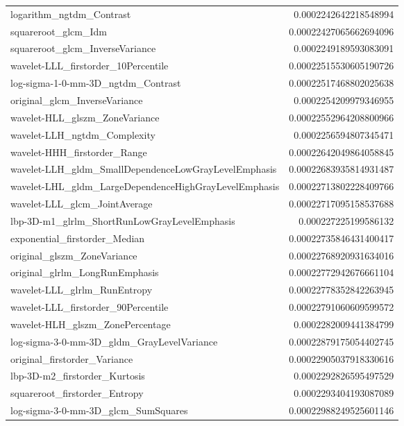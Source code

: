 {\begin{xltabular}[H]{\textwidth}{X r}
        logarithm\_ngtdm\_Contrast & 0.0002242642218548994 \\
        squareroot\_glcm\_Idm & 0.00022427065662694096 \\
        squareroot\_glcm\_InverseVariance & 0.0002249189593083091 \\
        wavelet-LLL\_firstorder\_10Percentile & 0.00022515530605190726 \\
        log-sigma-1-0-mm-3D\_ngtdm\_Contrast & 0.00022517468802025638 \\
        original\_glcm\_InverseVariance & 0.0002254209979346955 \\
        wavelet-HLL\_glszm\_ZoneVariance & 0.00022552964208800966 \\
        wavelet-LLH\_ngtdm\_Complexity & 0.0002256594807345471 \\
        wavelet-HHH\_firstorder\_Range & 0.00022642049864058845 \\
        wavelet-LLH\_gldm\_SmallDependenceLowGrayLevelEmphasis & 0.00022683935814931487 \\
        wavelet-LHL\_gldm\_LargeDependenceHighGrayLevelEmphasis & 0.00022713802228409766 \\
        wavelet-LLL\_glcm\_JointAverage & 0.00022717095158537688 \\
        lbp-3D-m1\_glrlm\_ShortRunLowGrayLevelEmphasis & 0.000227225199586132 \\
        exponential\_firstorder\_Median & 0.00022735846431400417 \\
        original\_glszm\_ZoneVariance & 0.00022768920931634016 \\
        original\_glrlm\_LongRunEmphasis & 0.00022772942676661104 \\
        wavelet-LLL\_glrlm\_RunEntropy & 0.00022778352842263945 \\
        wavelet-LLL\_firstorder\_90Percentile & 0.00022791060609599572 \\
        wavelet-HLH\_glszm\_ZonePercentage & 0.0002282009441384799 \\
        log-sigma-3-0-mm-3D\_gldm\_GrayLevelVariance & 0.00022879175054402745 \\
        original\_firstorder\_Variance & 0.00022905037918330616 \\
        lbp-3D-m2\_firstorder\_Kurtosis & 0.0002292826595497529 \\
        squareroot\_firstorder\_Entropy & 0.0002293404193087089 \\
        log-sigma-3-0-mm-3D\_glcm\_SumSquares & 0.00022988249525601146 \\

\end{xltabular}}

